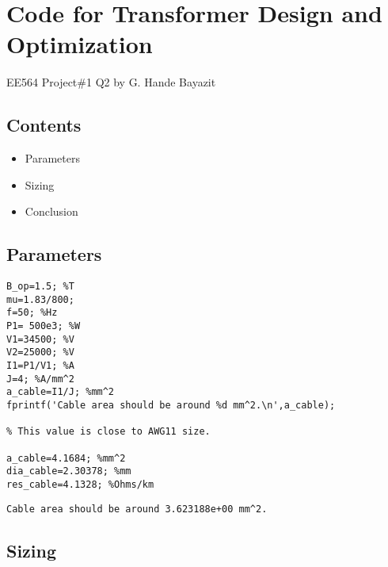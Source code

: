 \sloppy
{}
\setlength{\parindent}{0pt}

\section{Code for Transformer Design and Optimization}   
    
\begin{par}
EE564 Project\#1 Q2 by G. Hande Bayazit
\end{par} \vspace{1em}

\subsection*{Contents}

\begin{itemize}
\setlength{\itemsep}{-1ex}
   \item Parameters
   \item Sizing
   \item Conclusion
\end{itemize}


\subsection*{Parameters}

\begin{verbatim}
B_op=1.5; %T
mu=1.83/800;
f=50; %Hz
P1= 500e3; %W
V1=34500; %V
V2=25000; %V
I1=P1/V1; %A
J=4; %A/mm^2
a_cable=I1/J; %mm^2
fprintf('Cable area should be around %d mm^2.\n',a_cable);

% This value is close to AWG11 size.

a_cable=4.1684; %mm^2
dia_cable=2.30378; %mm
res_cable=4.1328; %Ohms/km
\end{verbatim}

        \color{lightgray} \begin{verbatim}Cable area should be around 3.623188e+00 mm^2.
\end{verbatim} \color{black}
    

\subsection*{Sizing}

